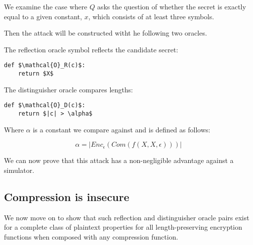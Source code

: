 \documentclass{article}
\begin{document}
We examine the case where $Q$ asks the question of whether the secret is
exactly equal to a given constant, $x$, which consists of at least three
symbols.

Then the attack will be constructed witht he following two oracles.

The reflection oracle symbol reflects the candidate secret:

\begin{lstlisting}[texcl,mathescape]
def $\mathcal{O}_R(c)$:
    return $X$
\end{lstlisting}

The distinguisher oracle compares lengths:

\begin{lstlisting}[texcl,mathescape]
def $\mathcal{O}_D(c)$:
    return $|c| > \alpha$
\end{lstlisting}

Where $\alpha$ is a constant we compare against and is defined as follows:

\begin{equation*}
\alpha = |Enc_\epsilon(Com(f(X, X, \epsilon)))|
\end{equation*}

We can now prove that this attack has a non-negligible advantage against a
simulator.

\subsection*{Compression is insecure}

We now move on to show that such reflection and distinguisher oracle pairs
exist for a complete class of plaintext properties for all length-preserving
encryption functions when composed with any compression function.
\end{document}
